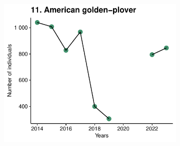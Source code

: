 \documentclass[a4paper,twoside,10pt]{article}
\begin{document}
\begin{figure}[H]
\begin{subfigure}{0.45\textwidth}
\includegraphics[width=\linewidth]{figures/species_temporal_series/American_golden-plover.pdf}
\end{subfigure}
\label{figure:other}
\end{figure} 
\newpage










\end{document}
